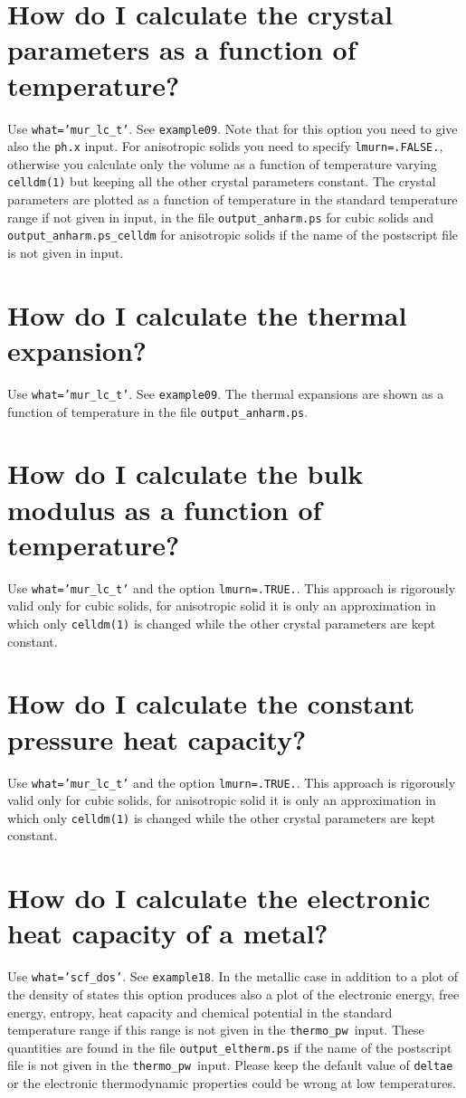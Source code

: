 \documentclass[12pt,a4paper]{article}
\def\thermo{\texttt{thermo\_pw}}
\begin{document}
\section{\color{coral} How do I calculate the crystal parameters as a function
of temperature?}
Use \texttt{what='mur\_lc\_t'}. See \texttt{example09}. Note that
for this option you need to give also the \texttt{ph.x} input.
For anisotropic solids you need to specify \texttt{lmurn=.FALSE.},
otherwise you calculate only the volume as a function of temperature
varying \texttt{celldm(1)} but keeping all the other crystal parameters
constant. The crystal parameters are plotted as a function of temperature
in the standard temperature range if not given in input, in the file 
\texttt{output\_anharm.ps} for cubic solids and
\texttt{output\_anharm.ps\_celldm} for anisotropic
solids if the name of the postscript file is not given in input.

\section{\color{coral} How do I calculate the thermal expansion?}
Use \texttt{what='mur\_lc\_t'}. See \texttt{example09}. The thermal expansions
are shown as a function of temperature in the file \texttt{output\_anharm.ps}.

\section{\color{coral} How do I calculate the bulk modulus as a function of 
temperature?}
Use \texttt{what='mur\_lc\_t'} and the option \texttt{lmurn=.TRUE.}.
This approach is rigorously valid only for cubic solids, for anisotropic
solid it is only an approximation in which only \texttt{celldm(1)} is
changed while the other crystal parameters are kept constant.

\section{\color{coral} How do I calculate the constant pressure heat capacity?}
Use \texttt{what='mur\_lc\_t'} and the option \texttt{lmurn=.TRUE.}.
This approach is rigorously valid only for cubic solids, for anisotropic
solid it is only an approximation in which only \texttt{celldm(1)} is
changed while the other crystal parameters are kept constant.

\section{\color{coral} How do I calculate the electronic heat capacity
of a metal?}
Use \texttt{what='scf\_dos'}. See \texttt{example18}. In the metallic
case in addition to a plot of the density of states this option produces
also a plot of the electronic energy, free energy, entropy, heat capacity
and chemical potential in the standard temperature range if this range is
not given in the \thermo\ input. These quantities are found in the file
\texttt{output\_eltherm.ps} if the name of the postscript
file is not given in the \thermo\ input.
Please keep the default value of \texttt{deltae} or the electronic
thermodynamic properties could be wrong at low temperatures.
\end{document}

